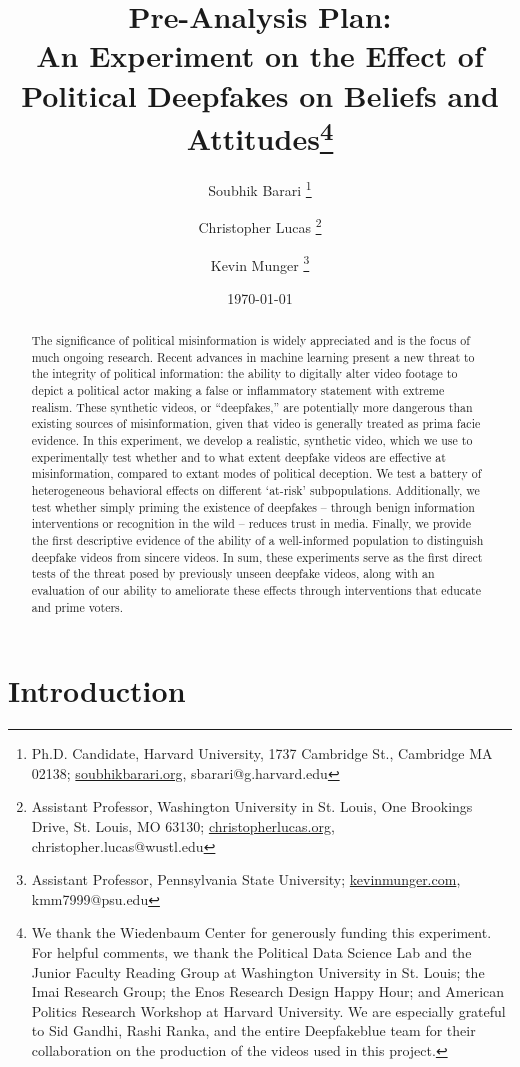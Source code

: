 \documentclass[12pt,letterpaper]{article}
\title{\bf Pre-Analysis Plan: \\ An Experiment on the Effect of Political Deepfakes on Beliefs and Attitudes\thanks{We thank the Wiedenbaum Center for generously funding this experiment. For helpful comments, we thank the Political Data Science Lab and the Junior Faculty Reading Group at Washington University in St. Louis; the Imai Research Group; the Enos Research Design Happy Hour; and American Politics Research Workshop at Harvard University. We are especially grateful to Sid Gandhi, Rashi Ranka, and the entire Deepfakeblue team for their collaboration on the production of the videos used in this project.}}
\author{
    Soubhik Barari
    \thanks{Ph.D. Candidate, Harvard University, 
    1737 Cambridge St., Cambridge MA 02138;
    \url{soubhikbarari.org}, sbarari@g.harvard.edu}
    \and
    Christopher Lucas
    \thanks{Assistant Professor, Washington University in
      St. Louis, One Brookings Drive, St. Louis, MO 63130;
      \url{christopherlucas.org}, christopher.lucas@wustl.edu}
    \and
    Kevin Munger
    \thanks{Assistant Professor, Pennsylvania State University; \url{kevinmunger.com}, kmm7999@psu.edu}}
\date{\today}
\begin{document}
\maketitle  

\begin{abstract}
\noindent The significance of political misinformation is widely appreciated and is the focus of much ongoing research. Recent advances in machine learning present a new threat to the integrity of political information: the ability to digitally alter video footage to depict a political actor making a false or inflammatory statement with extreme realism. These synthetic videos, or ``deepfakes,'' are potentially more dangerous than existing sources of misinformation, given that video is generally treated as prima facie evidence. In this experiment, we develop a realistic, synthetic video, which we use to experimentally test whether and to what extent deepfake videos are effective at misinformation, compared to extant modes of political deception. We test a battery of heterogeneous behavioral effects on different `at-risk' subpopulations. Additionally, we test whether simply priming the existence of deepfakes -- through benign information interventions or recognition in the wild -- reduces trust in media. Finally, we provide the first descriptive evidence of the ability of a well-informed population to distinguish deepfake videos from sincere videos. In sum, these experiments serve as the first direct tests of the threat posed by previously unseen deepfake videos, along with an evaluation of our ability to ameliorate these effects through interventions that educate and prime voters.
\end{abstract}  

\clearpage

{}\baselineskip    
\renewcommand{\baselinestretch}{1.15}

\maketitle

    
\section{Introduction}\label{intro}
\end{document}
